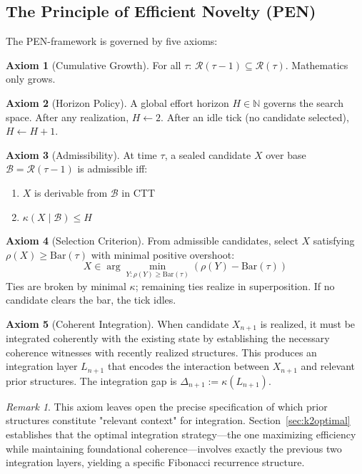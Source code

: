 \documentclass[11pt]{article}
\theoremstyle{definition}
\newtheorem{axiom}{Axiom}
\theoremstyle{plain}
\theoremstyle{remark}
\newtheorem{remark}{Remark}
\begin{document}
\subsection{The Principle of Efficient Novelty (PEN)}

The PEN-framework is governed by five axioms:

\begin{axiom}[Cumulative Growth]
For all $\tau$: $\mathcal{R}(\tau - 1) \subseteq \mathcal{R}(\tau)$. Mathematics only grows.
\end{axiom}

\begin{axiom}[Horizon Policy]
A global effort horizon $H \in \mathbb{N}$ governs the search space. After any realization, $H \leftarrow 2$. After an idle tick (no candidate selected), $H \leftarrow H + 1$.
\end{axiom}

\begin{axiom}[Admissibility]
At time $\tau$, a sealed candidate $X$ over base $\mathcal{B} = \mathcal{R}(\tau-1)$ is admissible iff:
\begin{enumerate}
\item $X$ is derivable from $\mathcal{B}$ in CTT
\item $\kappa(X \mid \mathcal{B}) \leq H$
\end{enumerate}
\end{axiom}

\begin{axiom}[Selection Criterion]
From admissible candidates, select $X$ satisfying $\rho(X) \geq \text{Bar}(\tau)$ with minimal positive overshoot:
\[
X \in \arg\min_{Y: \rho(Y) \geq \text{Bar}(\tau)} (\rho(Y) - \text{Bar}(\tau))
\]
Ties are broken by minimal $\kappa$; remaining ties realize in superposition. If no candidate clears the bar, the tick idles.
\end{axiom}

\begin{axiom}[Coherent Integration]
When candidate $X_{n+1}$ is realized, it must be integrated coherently with the existing state by establishing the necessary coherence witnesses with recently realized structures. This produces an integration layer $L_{n+1}$ that encodes the interaction between $X_{n+1}$ and relevant prior structures. The integration gap is $\Delta_{n+1} := \kappa(L_{n+1})$.
\end{axiom}

\begin{remark}
This axiom leaves open the precise specification of which prior structures constitute "relevant context" for integration. Section~\ref{sec:k2optimal} establishes that the optimal integration strategy—the one maximizing efficiency while maintaining foundational coherence—involves exactly the previous two integration layers, yielding a specific Fibonacci recurrence structure.
\end{remark}
\end{document}
